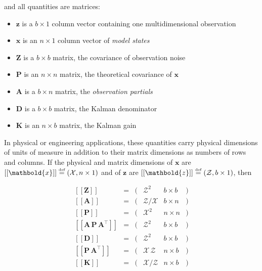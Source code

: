 \documentclass[10pt,oneside,x11names]{article}
\begin{document}
\noindent and all quantities are matrices:

\begin{itemize}
\item \(\mathbold{z}\) is a  \({b}\times{1}\) column vector containing one multidimensional observation
\item \(\mathbold{x}\) is an \({n}\times{1}\) column vector of \emph{model states}
\item \(\mathbold{Z}\) is a  \({b}\times{b}\) matrix, the covariance of
observation noise
\item \(\mathbold{P}\) is an \({n}\times{n}\) matrix, the theoretical
covariance of \(\mathbold{x}\)
\item \(\mathbold{A}\) is a  \({b}\times{n}\) matrix, the \emph{observation partials}
\item \(\mathbold{D}\) is a  \({b}\times{b}\) matrix, the Kalman denominator
\item \(\mathbold{K}\) is an \({n}\times{b}\) matrix, the Kalman gain
\end{itemize}

In physical or engineering applications, these quantities carry physical
dimensions of units of measure in addition to their matrix dimensions as numbers
of rows and columns. 
If the physical and matrix dimensions of 
\(\mathbold{x}\) 
are
\(\left[\left[\mathbold{x}\right]\right]
\stackrel{\text{\tiny def}}{=}
(\mathcal{X}, n\times{1})\)
and of 
\(\mathbold{z}\) 
are
\(\left[\left[\mathbold{z}\right]\right]
\stackrel{\text{\tiny def}}{=}
(\mathcal{Z}, b\times{1})\), then

\begin{equation}
\label{eqn:dimensional-breakdown}
\begin{array}{lccccr}
\left[\left[\mathbold{Z}\right]\right]                                       &=& (&\mathcal{Z}^2            & b\times{b}&) \\
\left[\left[\mathbold{A}\right]\right]                                       &=& (&\mathcal{Z}/\mathcal{X}  & b\times{n}&) \\
\left[\left[\mathbold{P}\right]\right]                                       &=& (&\mathcal{X}^2            & n\times{n}&) \\
\left[\left[\mathbold{A}\,\mathbold{P}\,\mathbold{A}^\intercal\right]\right] &=& (&\mathcal{Z}^2            & b\times{b}&) \\
\left[\left[\mathbold{D}\right]\right]                                       &=& (&\mathcal{Z}^2            & b\times{b}&) \\
\left[\left[\mathbold{P}\,\mathbold{A}^\intercal\right]\right]               &=& (&\mathcal{X}\,\mathcal{Z} & n\times{b}&) \\
\left[\left[\mathbold{K}\right]\right]                                       &=& (&\mathcal{X}/\mathcal{Z}  & n\times{b}&)
\end{array}
\end{equation}
\end{document}
